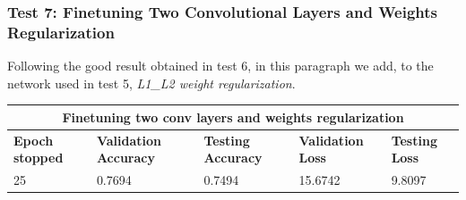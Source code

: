 \subsubsection{Test 7: Finetuning Two Convolutional Layers and Weights Regularization}
Following the good result obtained in test 6, in this paragraph we add, to the network used in test 5, \textit{L1\_L2 weight regularization}.

 \medskip

\begin{tabular}{ |p{2cm}|p{2cm}|p{2cm}|p{2cm}|p{2cm}|  }
\hline
\multicolumn{5}{|c|}{Finetuning two conv layers and weights regularization} \\
\hline
\textbf{Epoch stopped} & \textbf{Validation Accuracy} & \textbf{Testing Accuracy} & \textbf{Validation Loss} & \textbf{Testing Loss} \\
\hline
25 & 0.7694 & 0.7494 & 15.6742 & 9.8097\\
\hline
\end{tabular}

\medskip


